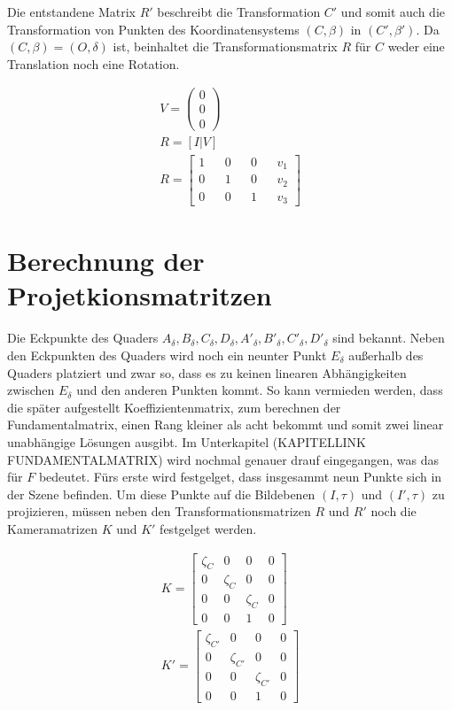 Die entstandene Matrix \ensuremath{R'} beschreibt die Transformation $C'$ und somit auch die Transformation von Punkten des Koordinatensystems $(C,\beta)$ in $(C',\beta')$. Da $(C,\beta) = (O,\delta)$ ist, beinhaltet die Transformationsmatrix $R$ für $C$ weder eine Translation noch eine Rotation.

\begin{gather}
V=\begin{pmatrix}
0\\0\\0
\end{pmatrix}\\
	R = [I|V]\\
	R = \begin{bmatrix}
	1&&0&&0&&v_1\\
	0&&1&&0&&v_2\\
	0&&0&&1&&v_3
	\end{bmatrix}
\end{gather} 


\section{Berechnung der Projetkionsmatritzen }

Die Eckpunkte des Quaders $A_\delta,B_\delta,C_\delta,D_\delta,A'_\delta,B'_\delta,C'_\delta,D'_\delta$ sind bekannt. Neben den Eckpunkten des Quaders wird noch ein neunter Punkt $E_\delta$ außerhalb des Quaders platziert und zwar so, dass es zu keinen linearen Abhängigkeiten zwischen $E_\delta$ und den anderen Punkten kommt. So kann vermieden werden, dass die später aufgestellt Koeffizientenmatrix, zum berechnen der Fundamentalmatrix, einen Rang kleiner als acht bekommt und somit zwei linear unabhängige Lösungen ausgibt\cite{HZ}. Im Unterkapitel (KAPITELLINK FUNDAMENTALMATRIX) wird nochmal genauer drauf eingegangen, was das für $F$ bedeutet. Fürs erste wird festgelget, dass insgesammt neun Punkte sich in der Szene befinden. Um diese Punkte auf die Bildebenen $(I,\tau)$ und $(I',\tau)$ zu projizieren, müssen neben den Transformationsmatrizen $R$ und $R'$ noch die Kameramatrizen $K$ und $K'$ festgelget werden. 


\begin{gather}		
K =
\begin{bmatrix}
\zeta_{C}&0&0&0\\
0&\zeta_{C}&0&0\\
0&0&\zeta_{C}&0\\
0&0&1&0
\end{bmatrix}\\
K' =
\begin{bmatrix}
\zeta_{C'}&0&0&0\\
0&\zeta_{C'}&0&0\\
0&0&\zeta_{C'}&0\\
0&0&1&0
\end{bmatrix}
\end{gather}

